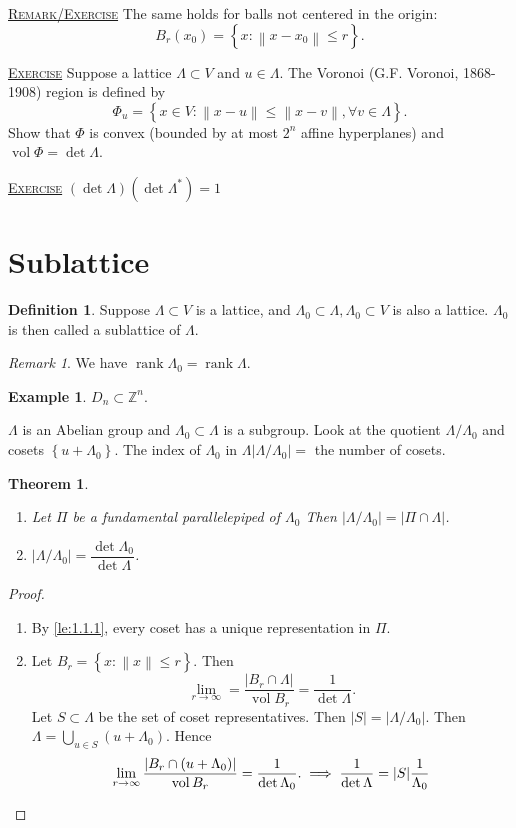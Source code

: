 \documentclass{report}
\newcommand{\Z}{\mathbb{Z}}
\newcommand{\vol}{\operatorname{vol}}
\newcommand{\norm}[1]{\left\| #1 \right\|}
\newcommand{\set}[1]{\left\{ #1 \right\}}
\newcommand{\rank}{\operatorname{rank}}
\newcommand{\fancyem}[1]{\underline{\textsc{#1}}}
\newtheorem{theorem}{Theorem}[section]
\theoremstyle{definition}
\newtheorem{definition}{Definition}[section]
\newtheorem{example}{Example}[section]
\theoremstyle{remark}
\newtheorem*{remark}{Remark}
\numberwithin{equation}{section}
\begin{document}
\fancyem{Remark/Exercise} The same holds for balls not centered in the origin: \[B_{r}(x_0) = \set{x: \norm{x - x_0} \leq r}.\]

\fancyem{Exercise} Suppose a lattice $\Lambda \subset V$ and $u \in \Lambda$. The Voronoi (G.F. Voronoi, 1868-1908) region is defined by \[
\Phi_{u} = \set{x \in V: \norm{x - u} \leq \norm{x-v}, \forall v \in \Lambda}.  
\]
Show that $\Phi$ is convex (bounded by at most $2^n$ affine hyperplanes) and $\vol \Phi = \det \Lambda$.

\fancyem{Exercise} $(\det \Lambda)(\det \Lambda^*) = 1$

\section{Sublattice}
\begin{definition}
    Suppose $\Lambda \subset V$ is a lattice, and $\Lambda_0 \subset \Lambda, \Lambda_0 \subset V$ is also a lattice. $\Lambda_0$ is then called a sublattice of $\Lambda$.
\end{definition}
\begin{remark}
    We have $\rank \Lambda_0 = \rank \Lambda$.
\end{remark}
\begin{example}
    $D_n \subset \Z^n$.
\end{example}
$\Lambda$ is an Abelian group and $\Lambda_0 \subset \Lambda$ is a subgroup. Look at the quotient $\Lambda/\Lambda_0$ and cosets $\set{u + \Lambda_0}$. The index of $\Lambda_0$ in $\Lambda |\Lambda / \Lambda_0| = $ the number of cosets.

\begin{theorem}
    \begin{enumerate}
        \item Let $\Pi$ be a fundamental parallelepiped of $\Lambda_0$ Then $|\Lambda / \Lambda_0| = |\Pi \cap \Lambda|$.
        \item $|\Lambda /\Lambda_0| = \dfrac{\det \Lambda_0}{\det \Lambda}$.
    \end{enumerate}
\end{theorem}
\begin{proof}
    \begin{enumerate}
        \item By \autoref{le:1.1.1}, every coset has a unique representation in $\Pi$.
        \item Let $B_r = \set{x: \norm{x} \leq r}$. Then \[\lim_{r \to \infty} = \frac{|B_r \cap \Lambda|}{\vol B_r} = \frac{1}{\det \Lambda}.\]
        Let $S \subset \Lambda$ be the set of coset representatives. Then $|S| = |\Lambda/\Lambda_0|.$ Then $\Lambda = \bigcup_{u \in S} (u + \Lambda_0)$. Hence \[\lim_{r \to \infty} \frac{|B_r \cap (u + \Lambda_0)|}{\vol B_r} = \frac{1}{\det \Lambda_0}. \implies \frac{1}{\det \Lambda} = |S|\frac{1}{\Lambda_0}\qedhere\]
    \end{enumerate}
\end{proof}
\end{document}
